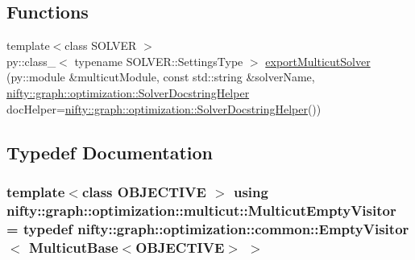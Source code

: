 \subsection*{Functions}
\begin{DoxyCompactItemize}
\item 
{\footnotesize template$<$class S\+O\+L\+V\+E\+R $>$ }\\py\+::class\+\_\+$<$ typename S\+O\+L\+V\+E\+R\+::\+Settings\+Type $>$ \hyperlink{namespacenifty_1_1graph_1_1optimization_1_1multicut_a4062f92131cfdad241fdbf60f3dd2fed}{export\+Multicut\+Solver} (py\+::module \&multicut\+Module, const std\+::string \&solver\+Name, \hyperlink{classnifty_1_1graph_1_1optimization_1_1SolverDocstringHelper}{nifty\+::graph\+::optimization\+::\+Solver\+Docstring\+Helper} doc\+Helper=\hyperlink{classnifty_1_1graph_1_1optimization_1_1SolverDocstringHelper}{nifty\+::graph\+::optimization\+::\+Solver\+Docstring\+Helper}())
\end{DoxyCompactItemize}


\subsection{Typedef Documentation}
\hypertarget{namespacenifty_1_1graph_1_1optimization_1_1multicut_afabf492f6831ee43b16508cb78726be8}{}
\subsubsection[{Multicut\+Empty\+Visitor}]{\setlength{\rightskip}{0pt plus 5cm}template$<$class O\+B\+J\+E\+C\+T\+I\+V\+E $>$ using {\bf nifty\+::graph\+::optimization\+::multicut\+::\+Multicut\+Empty\+Visitor} = typedef {\bf nifty\+::graph\+::optimization\+::common\+::\+Empty\+Visitor}$<$ {\bf Multicut\+Base}$<$O\+B\+J\+E\+C\+T\+I\+V\+E$>$ $>$}\label{namespacenifty_1_1graph_1_1optimization_1_1multicut_afabf492f6831ee43b16508cb78726be8}
\hypertarget{namespacenifty_1_1graph_1_1optimization_1_1multicut_a071c9020e064373e9c11465fbe1870f9}{}
